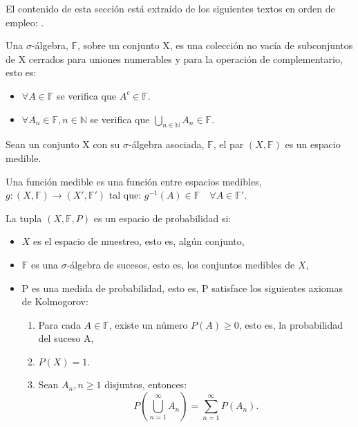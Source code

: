 \documentclass[../proyecto.tex]{memoir}
\begin{document}
El contenido de esta sección está extraído de los siguientes textos en orden de empleo: \cite{elLibro, grandesNumeros, loeve}. 

\begin{defi}
Una $\sigma$-álgebra, $\mathds{F}$, sobre un conjunto X, es una colección no vacía de subconjuntos de X cerrados para uniones numerables y para la operación de complementario, esto es:
\begin{itemize}
\item $\forall A \in \mathds{F}$ se verifica que $A^{c} \in \mathds{F}$.
\item $ \forall A_{n} \in \mathds{F}, n \in \mathds{N} $ se verifica que $\bigcup _{n \in \mathds{N}} A_{n} \in \mathds{F}$.
\end{itemize}
\end{defi}

\begin{defi}
Sean un conjunto X con su $\sigma$-álgebra asociada, $\mathds{F}$, el par $(X, \mathds{F})$ es un espacio medible. 
\end{defi}

\begin{defi}
Una función medible es una función entre espacios medibles, $g:  (X,\mathds{F}) \rightarrow (X',\mathds{F}')$ tal que: $g^{-1}(A) \in \mathds{F} \quad \forall A \in \mathds{F}'$.
\end{defi}

\begin{defi}
La tupla $(X, \mathds{F}, P)$ es un espacio de probabilidad si:
\begin{itemize}
\item $X$ es el espacio de muestreo, esto es, algún conjunto,
\item $\mathds{F}$ es una $\sigma$-álgebra de sucesos, esto es, los conjuntos medibles de $X$,
\item P es una medida de probabilidad, 
esto es, P satisface los siguientes axiomas de Kolmogorov:
\begin{enumerate}
\item Para cada $A\in\mathds{F}$, existe un número $P(A) \geq 0$, esto es, la probabilidad del suceso A,
\item $P(X)=1$.
\item Sean ${A_n, n \geq 1}$ disjuntos, entonces: $$
	P \left( \bigcup_{n=1}^{\infty} A_{n} \right) = \sum_{n=1}^{\infty} P(A_n).
$$
\end{enumerate}
\end{itemize}
\end{defi}
\end{document}
